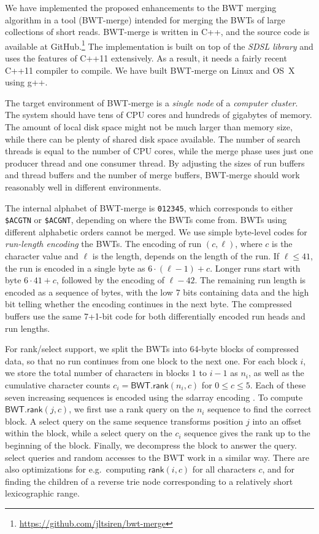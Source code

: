 \documentclass[smallabstract,smallcaptions]{dccpaper}
\newcommand{\BWT}{\textsf{BWT}}
\newcommand{\mBWT}{\ensuremath{\mathsf{BWT}}}
\newcommand{\rank}{\textsf{rank}}
\newcommand{\select}{\textsf{select}}
\newcommand{\mrank}{\ensuremath{\mathsf{rank}}}
\newcommand{\BWTmerge}{\textsf{BWT\nobreakdash-merge}}
\newcommand{\sdarray}{\textsf{sdarray}}
\begin{document}

We have implemented the proposed enhancements to the \BWT{} merging algorithm in a tool (\BWTmerge) intended for merging the \BWT{}s of large collections of short reads. \BWTmerge{} is written in C++, and the source code is available at GitHub.\footnote{\url{https://github.com/jltsiren/bwt-merge}} The implementation is built on top of the \emph{SDSL library} \cite{Gog2014b} and uses the features of C++11 extensively. As a result, it needs a fairly recent C++11 compiler to compile. We have built \BWTmerge{} on Linux and OS~X using g++.

The target environment of \BWTmerge{} is a \emph{single node} of a \emph{computer cluster}. The system should have tens of CPU cores and hundreds of gigabytes of memory. The amount of local disk space might not be much larger than memory size, while there can be plenty of shared disk space available. The number of search threads is equal to the number of CPU cores, while the merge phase uses just one producer thread and one consumer thread. By adjusting the sizes of run buffers and thread buffers and the number of merge buffers, \BWTmerge{} should work reasonably well in different environments.

The internal alphabet of \BWTmerge{} is \texttt{012345}, which corresponds to either \texttt{\$ACGTN} or \texttt{\$ACGNT}, depending on where the \BWT{}s come from. \BWT{}s using different alphabetic orders cannot be merged. We use simple byte-level codes for \emph{run-length encoding} the \BWT{}s. The encoding of run $(c, \ell)$, where $c$ is the character value and $\ell$ is the length, depends on the length of the run. If $\ell \le 41$, the run is encoded in a single byte as $6 \cdot (\ell-1) + c$. Longer runs start with byte $6 \cdot 41 + c$, followed by the encoding of $\ell-42$. The remaining run length is encoded as a sequence of bytes, with the low 7 bits containing data and the high bit telling whether the encoding continues in the next byte. The compressed buffers use the same 7+1\nobreakdash-bit code for both differentially encoded run heads and run lengths.

For \rank/\select{} support, we split the \BWT{}s into 64\nobreakdash-byte blocks of compressed data, so that no run continues from one block to the next one. For each block $i$, we store the total number of characters in blocks $1$ to $i-1$ as $n_{i}$, as well as the cumulative character counts $c_{i} = \mBWT.\mrank(n_{i},c)$ for $0 \le c \le 5$. Each of these seven increasing sequences is encoded using the \sdarray{} encoding \cite{Okanohara2007}. To compute $\mBWT.\mrank(j,c)$, we first use a \rank{} query on the $n_{i}$ sequence to find the correct block. A \select{} query on the same sequence transforms position $j$ into an offset within the block, while a \select{} query on the $c_{i}$ sequence gives the rank up to the beginning of the block. Finally, we decompress the block to answer the query. \select{} queries and random accesses to the \BWT{} work in a similar way. There are also optimizations for e.g.~computing $\mrank(i,c)$ for all characters $c$, and for finding the children of a reverse trie node corresponding to a relatively short lexicographic range.
\end{document}
